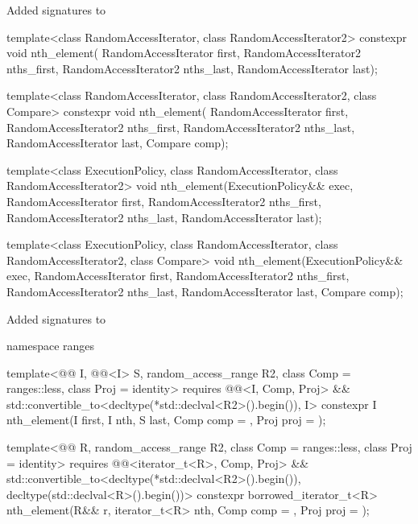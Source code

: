 Added signatures to 

\begin{codeblockAdd}
template<class RandomAccessIterator, class RandomAccessIterator2>
constexpr void nth_element(
RandomAccessIterator first, 
RandomAccessIterator2 nths_first, RandomAccessIterator2 nths_last,
RandomAccessIterator last);

template<class RandomAccessIterator, class RandomAccessIterator2, class Compare>
constexpr void nth_element(
RandomAccessIterator first, 
RandomAccessIterator2 nths_first, RandomAccessIterator2 nths_last,
RandomAccessIterator last, Compare comp);
\end{codeblockAdd}
\newpage
\begin{codeblockAdd}
template<class ExecutionPolicy, class RandomAccessIterator, class RandomAccessIterator2>
void nth_element(ExecutionPolicy&& exec,
RandomAccessIterator first, 
RandomAccessIterator2 nths_first, RandomAccessIterator2 nths_last,
RandomAccessIterator last);

template<class ExecutionPolicy, class RandomAccessIterator,
class RandomAccessIterator2, class Compare>
void nth_element(ExecutionPolicy&& exec,
RandomAccessIterator first, 
RandomAccessIterator2 nths_first, RandomAccessIterator2 nths_last,
RandomAccessIterator last, Compare comp);

\end{codeblockAdd}

Added signatures to 

\begin{codeblockAdd}
namespace ranges {
  template<@@ I, @@<I> S,
  random_access_range R2, class Comp = ranges::less, class Proj = identity>
  requires @@<I, Comp, Proj>
  && std::convertible_to<decltype(*std::declval<R2>().begin()), I>
  constexpr I nth_element(I first, I nth, S last, Comp comp = {}, Proj proj = {});

  template<@@ R,
  random_access_range R2, class Comp = ranges::less, class Proj = identity>
  requires @@<iterator_t<R>, Comp, Proj>
  && std::convertible_to<decltype(*std::declval<R2>().begin()), 
   decltype(std::declval<R>().begin())> 
  constexpr borrowed_iterator_t<R> 
  nth_element(R&& r, iterator_t<R> nth, Comp comp = {}, Proj proj = {}); 
}

\end{codeblockAdd}
%

